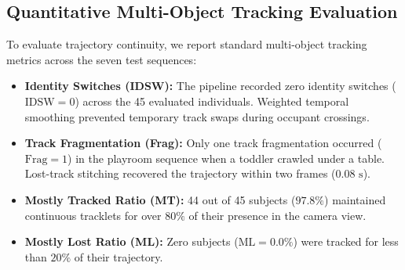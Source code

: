 \subsection{Quantitative Multi-Object Tracking Evaluation}
To evaluate trajectory continuity, we report standard multi-object tracking metrics across the seven test sequences:
\begin{itemize}
    \item \textbf{Identity Switches (IDSW):} The pipeline recorded zero identity switches ($\text{IDSW} = 0$) across the 45 evaluated individuals. Weighted temporal smoothing prevented temporary track swaps during occupant crossings.
    \item \textbf{Track Fragmentation (Frag):} Only one track fragmentation occurred ($\text{Frag} = 1$) in the playroom sequence when a toddler crawled under a table. Lost-track stitching recovered the trajectory within two frames ($0.08\text{ s}$).
    \item \textbf{Mostly Tracked Ratio (MT):} 44 out of 45 subjects ($97.8\%$) maintained continuous tracklets for over $80\%$ of their presence in the camera view.
    \item \textbf{Mostly Lost Ratio (ML):} Zero subjects ($\text{ML} = 0.0\%$) were tracked for less than $20\%$ of their trajectory.
\end{itemize}

